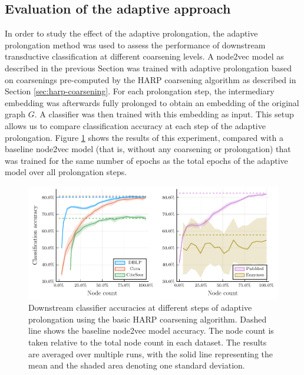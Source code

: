 \subsection{Evaluation of the adaptive approach}

In order to study the effect of the adaptive prolongation, the adaptive prolongation method was used to assess the performance of downstream transductive classification at different coarsening levels. A node2vec model as described in the previous Section was trained with adaptive prolongation based on coarsenings pre-computed by the HARP coarsening algorithm as described in Section \ref{sec:harp-coarsening}. For each prolongation step, the intermediary embedding was afterwards fully prolonged to obtain an embedding of the original graph \( G \). A classifier was then trained with this embedding as input. This setup allows us to compare classification accuracy at each step of the adaptive prolongation. Figure \ref{fig:adaptive-coarsening} shows the results of this experiment, compared with a baseline node2vec model (that is, without any coarsening or prolongation) that was trained for the same number of epochs as the total epochs of the adaptive model over all prolongation steps.

\begin{figure}
  \centering
  \includegraphics[width = \linewidth]{images/adaptive-coarsening/adaptive-coarsening.pdf}
  \caption{Downstream classifier accuracies at different steps of adaptive prolongation using the basic HARP coarsening algorithm. Dashed line shows the baseline node2vec model accuracy. The node count is taken relative to the total node count in each dataset. The results are averaged over multiple runs, with the solid line representing the mean and the shaded area denoting one standard deviation.}
  \label{fig:adaptive-coarsening}
\end{figure}

